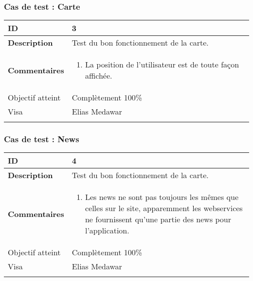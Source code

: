 		 		 \subsubsection*{Cas de test : Carte}
		 		 		 \begin{longtable}{m{4cm}|p{10cm}|}
		 		 		 \textbf{ ID} & 3 \\
		 		 		 \hline \textbf{Description} &  Test du bon fonctionnement de la carte.\\
		 		 		 \hline \textbf{Commentaires} &  
		 		 		 	 	 \begin{enumerate}
	 		 		 		 	 		\item La position de l'utilisateur est de toute façon affichée.
	 		 		 		 	\end{enumerate} \\
	 		 		 	\hline Objectif atteint & {\color{green} Complètement  100\% \CheckedBox } \\
	 		 		 	\hline Visa & Elias Medawar 	\\
		 		 		 \\
		 		 \end{longtable} 
		 		 \subsubsection*{Cas de test : News}
		 		 		 		 		 \begin{longtable}{m{4cm}|p{10cm}|}
		 		 		 		 		 \textbf{ ID} & 4 \\
		 		 		 		 		 \hline \textbf{Description} &  Test du bon fonctionnement de la carte.\\
		 		 		 		 		 \hline \textbf{Commentaires} &  
		 		 		 		 		 	 	 \begin{enumerate}
		 		 	 		 		 		 	 		\item Les news ne sont pas toujours les mêmes que celles sur le site, apparemment les webservices ne fournissent qu'une partie des news pour l'application.
		 		 	 		 					 	\end{enumerate} \\
		 		 	 		 		 		 \hline Objectif atteint & {\color{green} Complètement 100\% \CheckedBox } \\
		 		 	 		 		 		\hline Visa & Elias Medawar 	\\
		 		 		 		 		\\
		 		 		 		 \end{longtable} 
		 		 		 		 
